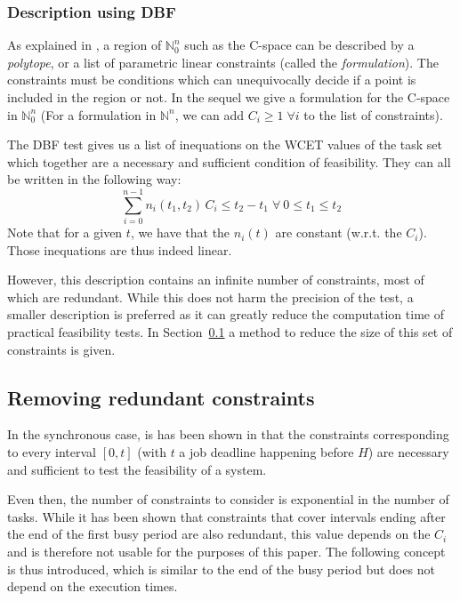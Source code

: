 \documentclass[conference]{IEEEtran}
\begin{document}
    \subsubsection{Description using DBF}
      \label{sct:cspaceDescr}

      As explained in \cite{nemhauser1988integer}, a region of $\mathbb{N}_0^n$ such as the C-space can be described by a \emph{polytope}, or a list of parametric linear constraints (called the \emph{formulation}). The constraints must be conditions which can unequivocally decide if a point is included in the region or not. In the sequel we give a formulation for the C-space in $\mathbb{N}_0^n$ (For a formulation in $\mathbb{N}^n$, we can add $C_i \geqslant 1 \; \forall i$ to the list of constraints).

      The DBF test gives us a list of inequations on the WCET values of the task set which together are a necessary and sufficient condition of feasibility. They can all be written in the following way:
      \[
        \sum_{i=0}^{n-1} n_i(t_1, t_2) \, C_i \leq t_2 - t_1 \; \forall \: 0 \leq t_1 \leq t_2
      \]
      Note that for a given $t$, we have that the $n_i(t)$ are
      constant (w.r.t. the $C_i$). Those inequations are thus indeed linear.

      However, this description contains an infinite number of constraints, most of
      which are redundant. While this does not harm the precision of the
      test, a smaller description is preferred as it can greatly
      reduce the computation time of practical feasibility tests. In Section~\ref{sct:removeRedundancy} a method to reduce the size of this set of constraints is given.

  \subsection{Removing redundant constraints}
    \label{sct:removeRedundancy}

  In the synchronous case, is has been shown in \cite{baruah1990algorithms} that the constraints corresponding
  to every interval $[0, t]$ (with $t$ a job deadline happening before $H$) are
  necessary and sufficient to test the feasibility of a system.

  Even then, the number of constraints to consider is exponential in the number
  of tasks. While it has been shown that constraints that cover intervals ending
  after the end of the first busy period are also redundant, this value depends on the $C_i$ and is
  therefore not usable for the purposes of this paper. The
  following concept is thus introduced, which is similar to the end of the busy period but does not depend on the execution times.
\end{document}
